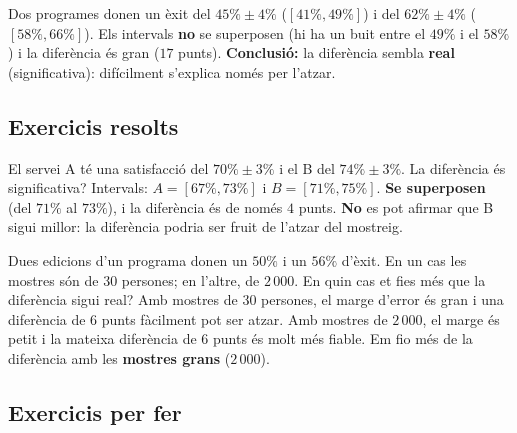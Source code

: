 \begin{exemple}
Dos programes donen un èxit del $45\%\pm 4\%$ ($[41\%,49\%]$) i del $62\%\pm 4\%$
($[58\%,66\%]$). Els intervals \textbf{no} se superposen (hi ha un buit entre el $49\%$ i el
$58\%$) i la diferència és gran ($17$ punts). \textbf{Conclusió:} la diferència sembla
\textbf{real} (significativa): difícilment s'explica només per l'atzar.
\end{exemple}

\subsection{Exercicis resolts}

\begin{exresolt}
El servei A té una satisfacció del $70\%\pm 3\%$ i el B del $74\%\pm 3\%$. La diferència és
significativa?
\solucio
Intervals: $A=[67\%,73\%]$ i $B=[71\%,75\%]$. \textbf{Se superposen} (del $71\%$ al $73\%$),
i la diferència és de només $4$ punts. \textbf{No} es pot afirmar que B sigui millor: la
diferència podria ser fruit de l'atzar del mostreig.
\end{exresolt}

\begin{exresolt}
Dues edicions d'un programa donen un $50\%$ i un $56\%$ d'èxit. En un cas les mostres són de
$30$ persones; en l'altre, de $2\,000$. En quin cas et fies més que la diferència sigui
real?
\solucio
Amb mostres de $30$ persones, el marge d'error és gran i una diferència de $6$ punts
fàcilment pot ser atzar. Amb mostres de $2\,000$, el marge és petit i la mateixa diferència
de $6$ punts és molt més fiable. Em fio més de la diferència amb les \textbf{mostres grans}
($2\,000$).
\end{exresolt}

\subsection{Exercicis per fer}

